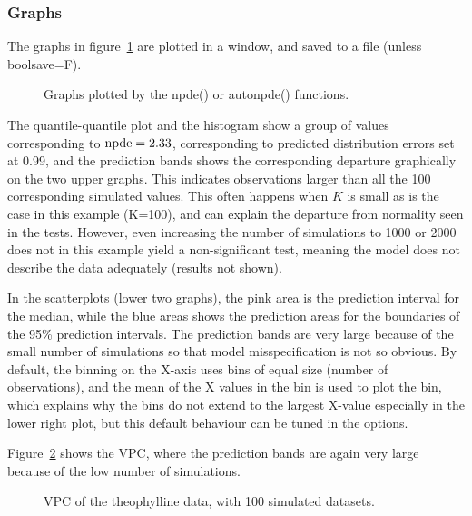 \subsubsection{Graphs}

\hskip 18pt The graphs in figure~\ref{fig:respde} are plotted in a window, and saved to a file (unless {\sf boolsave=F}).
\begin{figure}[!h]
\par\kern -0.3cm
\begin{center}
\end{center}
\caption{Graphs plotted by the {\sf npde()} or {\sf autonpde()}
functions.}\label{fig:respde}
\end{figure}
The quantile-quantile plot and the histogram show a group of values corresponding to ${\rm npde}=2.33$, corresponding to predicted distribution errors set at 0.99, and the prediction bands shows the corresponding departure graphically on the two upper graphs. This indicates observations larger than all the 100 corresponding simulated values. This often happens when $K$ is small as is the case in this example (K=100), and can explain the departure from normality seen in the tests. However, even increasing the number of simulations to 1000 or 2000 does not in this example yield a non-significant test, meaning the model does not describe the data adequately (results not shown).

In the scatterplots (lower two graphs), the pink area is the prediction interval for the median, while the blue areas shows the prediction areas for the boundaries of the 95\% prediction intervals. The prediction bands are very large because of the small number of simulations so that model misspecification is not so obvious. By default, the binning on the X-axis uses bins of equal size (number of observations), and the mean of the X values in the bin is used to plot the bin, which explains why the bins do not extend to the largest X-value especially in the lower right plot, but this default behaviour can be tuned in the options.

Figure~\ref{fig:theovpc} shows the VPC, where the prediction bands are again very large because of the low number of simulations.
\begin{figure}[!h]
\par\kern -0.3cm
\begin{center}
\end{center}
\caption{VPC of the theophylline data, with 100 simulated datasets.}\label{fig:theovpc}
\end{figure}

